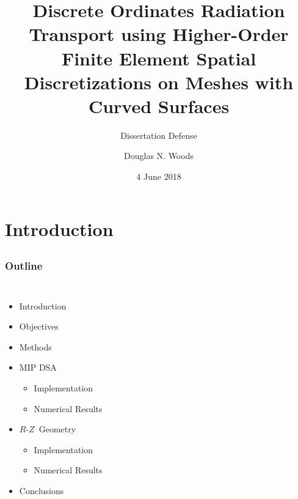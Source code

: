 \documentclass[compress,t]{beamer}
\title{Discrete Ordinates Radiation Transport using Higher-Order Finite Element Spatial Discretizations on Meshes with Curved Surfaces}
\author[1]{Douglas N. Woods}
\date{4 June 2018}
\subtitle{Dissertation Defense}
\newcommand{\RZ}{$R$-$Z$}
\begin{document}
\setlength{\abovedisplayskip}{5pt}
\setlength{\belowdisplayskip}{5pt}

\typeout{*******************************************************************}
\begin{frame}[label=title,plain] %
\titlepage
\end{frame}

\section{Introduction}
\subsection{}

\begin{frame}
\frametitle{Outline}

\begin{columns}[T]

\column{\textwidth}
\begin{itemize}
\item{Introduction}
\item{Objectives}
\item{Methods}
\item{MIP DSA}
\begin{itemize}
\item{Implementation}
\item{Numerical Results}
\end{itemize}
\item{\RZ\ Geometry}
\begin{itemize}
\item{Implementation}
\item{Numerical Results}
\end{itemize}
\item{Conclusions}
\end{itemize}

\begin{figure}[!h]
\flushright
\vspace{-8pt}
\end{figure}

\end{columns}

\end{frame}
\end{document}
